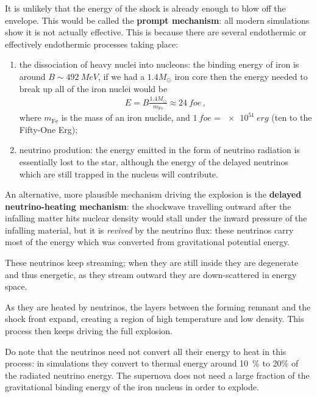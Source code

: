 \documentclass[main.tex]{subfiles}
\begin{document}

It is unlikely that the energy of the shock is already enough to blow off the envelope. This would be called the \textbf{prompt mechanism}: all modern simulations show it is not actually effective.
This is because there are several endothermic or effectively endothermic processes taking place: 
\begin{enumerate}
  \item the dissociation of heavy nuclei into nucleons: the binding energy of iron is around \(B \sim \SI{492}{MeV}\), if we had a \(1.4 M_{\odot}\) iron core then the energy needed to break up all of the iron nuclei would be 
  \begin{align}
  E = B \frac{1.4 M_{\odot}}{m _{\text{Fe}}} \approx \SI{24}{foe}
  \,,
  \end{align}
  where \(m _{\text{Fe}}\) is the mass of an iron nuclide, and \(\SI{1}{foe} = \SI{e51}{erg}\) (ten to the Fifty-One Erg);
  \item neutrino prodution: the energy emitted in the form of neutrino radiation is essentially lost to the star, although
  the energy of the delayed neutrinos which are still trapped in the nucleus will contribute.
\end{enumerate}

An alternative, more plausible mechanism driving the explosion is the  \textbf{delayed neutrino-heating mechanism}: the shockwave travelling outward after the infalling matter hits nuclear density would stall under the inward pressure of the infalling material, but it is \emph{revived} by the neutrino flux: these neutrinos carry most of the energy which was converted from gravitational potential energy.

These neutrinos keep streaming; when they are still inside they are degenerate and thus energetic, as they stream outward they are down-scattered in energy space.

As they are heated by neutrinos, the layers between the forming remnant and the shock front expand, creating a region of high temperature and low density.
This process then keeps driving the full explosion.

Do note that the neutrinos need not convert all their energy to heat in this process: in simulations they convert to thermal energy around \SI{10}{\%} to \num{20}{\%} of the radiated neutrino energy.
The supernova does not need a large fraction of the gravitational binding energy of the iron nucleus in order to explode.
\end{document}
